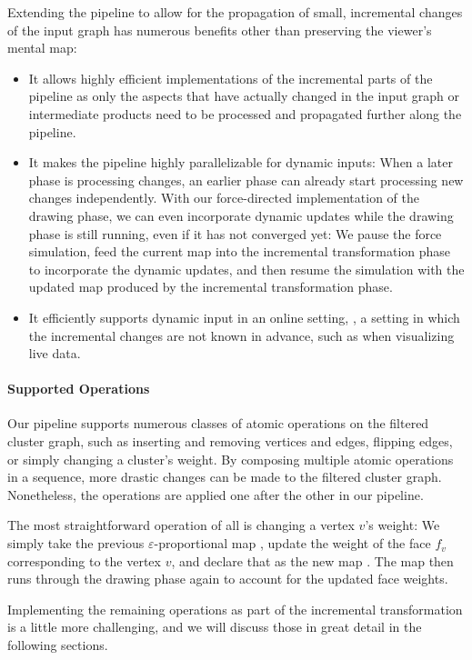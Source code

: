 Extending the pipeline to allow for the propagation of small, incremental changes of the input graph has numerous benefits other than preserving the viewer's mental map:
%
\begin{itemize}
\item It allows highly efficient implementations of the incremental parts of the pipeline as only the aspects that have actually changed in the input graph or intermediate products need to be processed and propagated further along the pipeline.
\item It makes the pipeline highly parallelizable for dynamic inputs:
When a later phase is processing changes, an earlier phase can already start processing new changes independently.
With our force-directed implementation of the drawing phase, we can even incorporate dynamic updates while the drawing phase is still running, even if it has not converged yet:
We pause the force simulation, feed the current map  into the incremental transformation phase to incorporate the dynamic updates, and then resume the simulation with the updated map  produced by the incremental transformation phase.
\item It efficiently supports dynamic input in an online setting, \ie{}, a setting in which the incremental changes are not known in advance, such as when visualizing live data.
\end{itemize}



\paragraph{Supported Operations}

Our pipeline supports numerous classes of atomic operations on the filtered cluster graph, such as inserting and removing vertices and edges, flipping edges, or simply changing a cluster's weight.
By composing multiple atomic operations in a sequence, more drastic changes can be made to the filtered cluster graph.
Nonetheless, the operations are applied one after the other in our pipeline.

The most straightforward operation of all is changing a vertex $v$'s weight:
We simply take the previous $\varepsilon$-proportional map , update the weight of the face $f_v$ corresponding to the vertex $v$, and declare that as the new map .
The map  then runs through the drawing phase again to account for the updated face weights.

Implementing the remaining operations as part of the incremental transformation is a little more challenging, and we will discuss those in great detail in the following sections.

\clearpage

\clearpage

\clearpage

